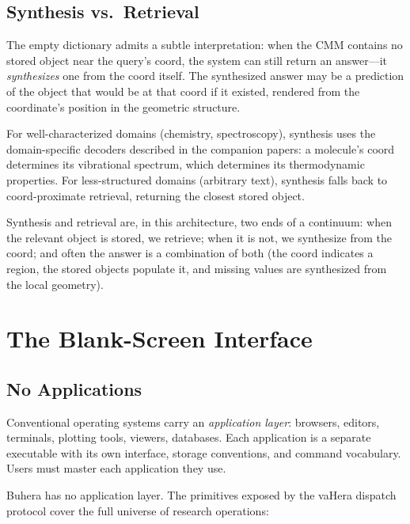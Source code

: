 \documentclass[11pt,twocolumn,a4paper]{article}
\begin{document}
\subsection{Synthesis vs.\ Retrieval}

The empty dictionary admits a subtle interpretation: when the CMM contains no stored object near the query's coord, the system can still return an answer---it \emph{synthesizes} one from the coord itself. The synthesized answer may be a prediction of the object that would be at that coord if it existed, rendered from the coordinate's position in the geometric structure.

For well-characterized domains (chemistry, spectroscopy), synthesis uses the domain-specific decoders described in the companion papers: a molecule's coord determines its vibrational spectrum, which determines its thermodynamic properties. For less-structured domains (arbitrary text), synthesis falls back to coord-proximate retrieval, returning the closest stored object.

Synthesis and retrieval are, in this architecture, two ends of a continuum: when the relevant object is stored, we retrieve; when it is not, we synthesize from the coord; and often the answer is a combination of both (the coord indicates a region, the stored objects populate it, and missing values are synthesized from the local geometry).


\section{The Blank-Screen Interface}
\label{sec:blank}

\subsection{No Applications}

Conventional operating systems carry an \emph{application layer}: browsers, editors, terminals, plotting tools, viewers, databases. Each application is a separate executable with its own interface, storage conventions, and command vocabulary. Users must master each application they use.

Buhera has no application layer. The primitives exposed by the vaHera dispatch protocol cover the full universe of research operations:
\end{document}
